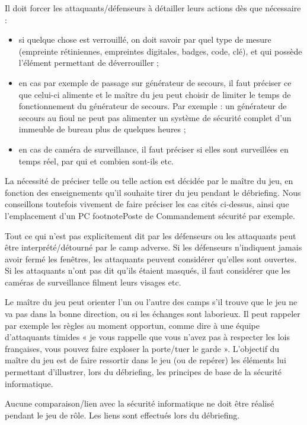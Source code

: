 \documentclass[11pt]{article} %
\begin{document}
Il doit forcer les attaquants/défenseurs à détailler leurs actions dès que
nécessaire :
\begin{itemize}
\item si quelque chose est verrouillé, on doit savoir par quel type de mesure
(empreinte rétiniennes, empreintes digitales, badges, code, clé), et qui possède
l'élément permettant de déverrouiller ;
\item en cas par exemple de passage sur générateur de secours, il faut préciser
ce que celui-ci alimente et le maître du jeu peut choisir de limiter le temps de
fonctionnement du générateur de secours. Par exemple : un générateur de secours
au fioul ne peut pas alimenter un système de sécurité complet d'un immeuble de
bureau plus de quelques heures ;
\item en cas de caméra de surveillance, il faut préciser si elles sont
surveillées en temps réel, par qui et combien sont-ils etc.
\end{itemize}
La nécessité de préciser telle ou telle action est décidée par le maître du jeu,
en fonction des enseignements qu'il souhaite tirer du jeu pendant le débriefing.
Nous conseillons toutefois vivement de faire préciser les cas cités ci-dessus,
ainsi que l'emplacement d'un PC footnote{Poste de Commandement} sécurité par
exemple.

Tout ce qui n'est pas explicitement dit par les défenseurs ou les attaquants
peut être interprété/détourné par le camp adverse. Si les défenseurs n'indiquent
jamais avoir fermé les fenêtres, les attaquants peuvent considérer qu'elles sont
ouvertes. Si les attaquants n'ont pas dit qu'ils étaient masqués, il faut
considérer que les caméras de surveillance filment leurs visages etc.

Le maître du jeu peut orienter l'un ou l'autre des camps s'il trouve que le jeu
ne va pas dans la bonne direction,
ou si les échanges sont laborieux. Il peut rappeler par exemple les règles au
moment opportun, comme dire à une équipe d'attaquants timides « je vous rappelle
que vous n'avez pas à respecter les lois françaises, vous pouvez faire exploser
la porte/tuer le garde ». L'objectif du maître du jeu est de faire ressortir
dans le jeu (ou de repérer) les éléments lui permettant d'illustrer, lors du
débriefing, les principes de base de la sécurité informatique.

Aucune comparaison/lien avec la sécurité informatique ne doit être réalisé
pendant le jeu de rôle. Les liens sont effectués lors du débriefing.
\end{document}
